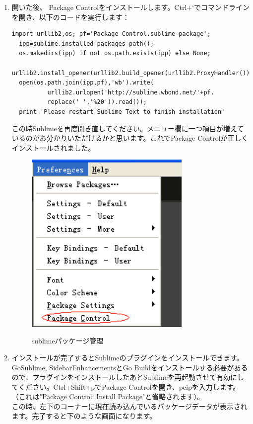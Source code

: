 \begin{enumerate}
  \item 開いた後、 Package Controlをインストールします。Ctrl+`でコマンドラインを開き、以下のコードを実行します：
\begin{lstlisting}[numbers=none]
  import urllib2,os; pf='Package Control.sublime-package';
  ipp=sublime.installed_packages_path();
  os.makedirs(ipp) if not os.path.exists(ipp) else None;
  urllib2.install_opener(urllib2.build_opener(urllib2.ProxyHandler()));
  open(os.path.join(ipp,pf),'wb').write(
          urllib2.urlopen('http://sublime.wbond.net/'+pf.
          replace(' ','%20')).read());
  print 'Please restart Sublime Text to finish installation'
\end{lstlisting}
この時Sublimeを再度開き直してください。メニュー欄に一つ項目が増えているのがお分かりいただけるかと思います。これでPackage Controlが正しくインストールされました。\\ 
\begin{figure}[H]
  \includegraphics[width=8cm]{1.4.sublime3.png}
   \label{図1.7}
   \caption{sublimeパッケージ管理}
\end{figure}
  \item インストールが完了するとSublimeのプラグインをインストールできます。GoSublime, SidebarEnhancementsとGo Buildをインストールする必要があるので、プラグインをインストールしたあとSublimeを再起動させて有効にしてください。Ctrl+Shift+pでPackage Controlを開き、pcipを入力します。（これは"Package Control: Install Package"と省略されます）。\\ この時、左下のコーナーに現在読み込んでいるパッケージデータが表示されます。完了すると下のような画面になります。\\ 
\begin{figure}[H]

\end{figure}
\end{enumerate}
